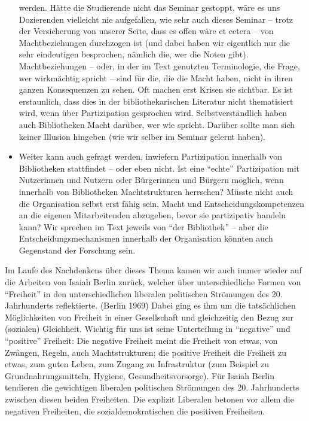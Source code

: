 \documentclass[a4paper,
fontsize=11pt,
oneside,
numbers=noperiodatend,
parskip=half-,
bibliography=totoc,
final
]{scrartcl}
\begin{document}
\begin{itemize}
{    werden. Hätte die Studierende nicht das Seminar gestoppt, wäre es
    uns Dozierenden vielleicht nie aufgefallen, wie sehr auch dieses
    Seminar -- trotz der Versicherung von unserer Seite, dass es offen
    wäre et cetera -- von Machtbeziehungen durchzogen ist (und dabei
    haben wir eigentlich nur die sehr eindeutigen besprochen, nämlich
    die, wer die Noten gibt). Machtbeziehungen -- oder, in der im Text
    genutzten Terminologie, die Frage, wer wirkmächtig spricht -- sind
    für die, die die Macht haben, nicht in ihren ganzen Konsequenzen zu
    sehen. Oft machen erst Krisen sie sichtbar. Es ist erstaunlich, dass
    dies in der bibliothekarischen Literatur nicht thematisiert wird,
    wenn über Partizipation gesprochen wird. Selbstverständlich haben
    auch Bibliotheken Macht darüber, wer wie spricht. Darüber sollte man
    sich keiner Illusion hingeben (wie wir selber im Seminar gelernt
    haben).}
\item
  Weiter kann auch gefragt werden, inwiefern Partizipation innerhalb von
  Bibliotheken stattfindet -- oder eben nicht. Ist eine \enquote{echte}
  Partizipation mit Nutzerinnen und Nutzern oder Bürgerinnen und Bürgern
  möglich, wenn innerhalb von Bibliotheken Machtstrukturen herrschen?
  Müsste nicht auch die Organisation selbst erst fähig sein, Macht und
  Entscheidungskompetenzen an die eigenen Mitarbeitenden abzugeben,
  bevor sie partizipativ handeln kann? Wir sprechen im Text jeweils von
  \enquote{der Bibliothek} -- aber die Entscheidungsmechanismen
  innerhalb der Organisation könnten auch Gegenstand der Forschung sein.
\end{itemize}

Im Laufe des Nachdenkens über dieses Thema kamen wir auch immer wieder
auf die Arbeiten von Isaiah Berlin zurück, welcher über unterschiedliche
Formen von \enquote{Freiheit} in den unterschiedlichen liberalen
politischen Strömungen des 20. Jahrhunderts reflektierte. (Berlin 1969)
Dabei ging es ihm um die tatsächlichen Möglichkeiten von Freiheit in
einer Gesellschaft und gleichzeitig den Bezug zur (sozialen) Gleichheit.
Wichtig für uns ist seine Unterteilung in \enquote{negative} und
\enquote{positive} Freiheit: Die negative Freiheit meint die Freiheit
von etwas, von Zwängen, Regeln, auch Machtstrukturen; die positive
Freiheit die Freiheit zu etwas, zum guten Leben, zum Zugang zu
Infrastruktur (zum Beispiel zu Grundnahrungsmitteln, Hygiene,
Gesundheitsvorsorge). Für Isaiah Berlin tendieren die gewichtigen
liberalen politischen Strömungen des 20. Jahrhunderts zwischen diesen
beiden Freiheiten. Die explizit Liberalen betonen vor allem die
negativen Freiheiten, die sozialdemokratischen die positiven Freiheiten.
\end{document}

